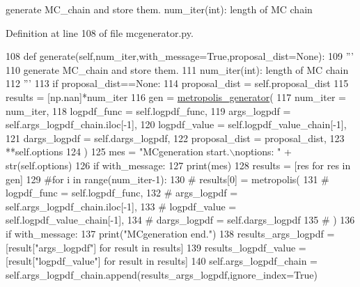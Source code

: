 \begin{DoxyVerb}generate MC_chain and store them.
num_iter(int): length of MC chain
\end{DoxyVerb}
 

Definition at line 108 of file mcgenerator.\+py.


\begin{DoxyCode}
108     \textcolor{keyword}{def }generate(self,num\_iter,with\_message=True,proposal\_dist=None):
109         \textcolor{stringliteral}{'''}
110 \textcolor{stringliteral}{        generate MC\_chain and store them.}
111 \textcolor{stringliteral}{        num\_iter(int): length of MC chain}
112 \textcolor{stringliteral}{        '''}
113         \textcolor{keywordflow}{if} proposal\_dist==\textcolor{keywordtype}{None}:
114             proposal\_dist = self.proposal\_dist
115         results = [np.nan]*num\_iter
116         gen = \hyperlink{namespacemcgenerator_a8f55af530516085f0a5169e130a9b35b}{metropolis\_generator}(
117             num\_iter = num\_iter,
118             logpdf\_func = self.logpdf\_func,
119             args\_logpdf = self.args\_logpdf\_chain.iloc[-1],
120             logpdf\_value = self.logpdf\_value\_chain[-1],
121             dargs\_logpdf = self.dargs\_logpdf,
122             proposal\_dist = proposal\_dist,
123             **self.options
124             )
125         mes = \textcolor{stringliteral}{"MCgeneration start.\(\backslash\)noptions: "} + str(self.options)
126         \textcolor{keywordflow}{if} with\_message:
127             print(mes)
128         results = [res \textcolor{keywordflow}{for} res \textcolor{keywordflow}{in} gen] 
129         \textcolor{comment}{#for i in range(num\_iter-1):}
130         \textcolor{comment}{#    results[0] = metropolis(}
131         \textcolor{comment}{#        logpdf\_func = self.logpdf\_func,}
132         \textcolor{comment}{#        args\_logpdf = self.args\_logpdf\_chain.iloc[-1],}
133         \textcolor{comment}{#        logpdf\_value = self.logpdf\_value\_chain[-1],}
134         \textcolor{comment}{#        dargs\_logpdf = self.dargs\_logpdf}
135         \textcolor{comment}{#        )}
136         \textcolor{keywordflow}{if} with\_message:
137             print(\textcolor{stringliteral}{"MCgeneration end."})
138         results\_args\_logpdf = [result[\textcolor{stringliteral}{"args\_logpdf"}] \textcolor{keywordflow}{for} result \textcolor{keywordflow}{in} results]
139         results\_logpdf\_value = [result[\textcolor{stringliteral}{"logpdf\_value"}] \textcolor{keywordflow}{for} result \textcolor{keywordflow}{in} results]
140         self.args\_logpdf\_chain = self.args\_logpdf\_chain.append(results\_args\_logpdf,ignore\_index=\textcolor{keyword}{True})

\end{DoxyCode}
